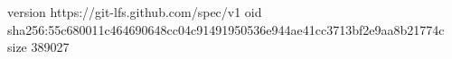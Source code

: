 version https://git-lfs.github.com/spec/v1
oid sha256:55c680011c464690648cc04c91491950536e944ae41cc3713bf2e9aa8b21774c
size 389027
